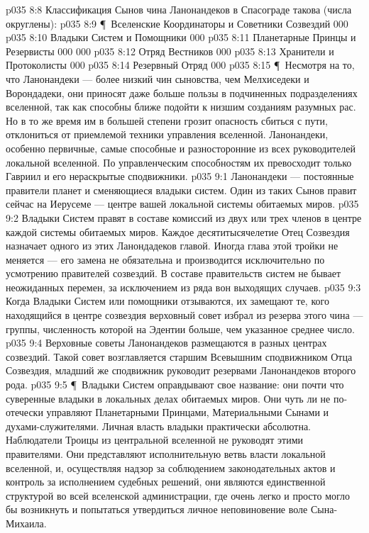 \vs p035 8:8 Классификация Сынов чина Ланонандеков в Спасограде такова (числа округлены):
\vs p035 8:9 \P\ Вселенские Координаторы и Советники Созвездий 000
\vs p035 8:10 Владыки Систем и Помощники 000
\vs p035 8:11 Планетарные Принцы и Резервисты 000 000
\vs p035 8:12 Отряд Вестников 000
\vs p035 8:13 Хранители и Протоколисты 000
\vs p035 8:14 Резервный Отряд 000
\vs p035 8:15 \P\ Несмотря на то, что Ланонандеки --- более низкий чин сыновства, чем Мелхиседеки и Ворондадеки, они приносят даже больше пользы в подчиненных подразделениях вселенной, так как способны ближе подойти к низшим созданиям разумных рас. Но в то же время им в большей степени грозит опасность сбиться с пути, отклониться от приемлемой техники управления вселенной. Ланонандеки, особенно первичные, самые способные и разносторонние из всех руководителей локальной вселенной. По управленческим способностям их превосходит только Гавриил и его нераскрытые сподвижники.
\vs p035 9:1 Ланонандеки --- постоянные правители планет и сменяющиеся владыки систем. Один из таких Сынов правит сейчас на Иерусеме --- центре вашей локальной системы обитаемых миров.
\vs p035 9:2 Владыки Систем правят в составе комиссий из двух или трех членов в центре каждой системы обитаемых миров. Каждое десятитысячелетие Отец Созвездия назначает одного из этих Ланондадеков главой. Иногда глава этой тройки не меняется --- его замена не обязательна и производится исключительно по усмотрению правителей созвездий. В составе правительств систем не бывает неожиданных перемен, за исключением из ряда вон выходящих случаев.
\vs p035 9:3 Когда Владыки Систем или помощники отзываются, их замещают те, кого находящийся в центре созвездия верховный совет избрал из резерва этого чина --- группы, численность которой на Эдентии больше, чем указанное среднее число.
\vs p035 9:4 Верховные советы Ланонандеков размещаются в разных центрах созвездий. Такой совет возглавляется старшим Всевышним сподвижником Отца Созвездия, младший же сподвижник руководит резервами Ланонандеков второго рода.
\vs p035 9:5 \P\ Владыки Систем оправдывают свое название: они почти что суверенные владыки в локальных делах обитаемых миров. Они чуть ли не по\hyp{}отечески управляют Планетарными Принцами, Материальными Сынами и духами\hyp{}служителями. Личная власть владыки практически абсолютна. Наблюдатели Троицы из центральной вселенной не руководят этими правителями. Они представляют исполнительную ветвь власти локальной вселенной, и, осуществляя надзор за соблюдением законодательных актов и контроль за исполнением судебных решений, они являются единственной структурой во всей вселенской администрации, где очень легко и просто могло бы возникнуть и попытаться утвердиться личное неповиновение воле Сына\hyp{}Михаила.
